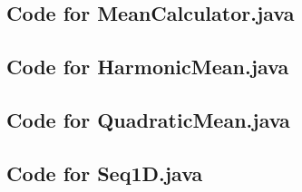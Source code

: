 \documentclass[12pt,fleqn]{examtst}
\begin{document}

\newpage

\subsection*{Code for MeanCalculator.java}

\noindent 

\newpage

\subsection*{Code for HarmonicMean.java}

\noindent 

\newpage

\subsection*{Code for QuadraticMean.java}

\noindent 

\newpage

\subsection*{Code for Seq1D.java}

\noindent 

\end{document}
